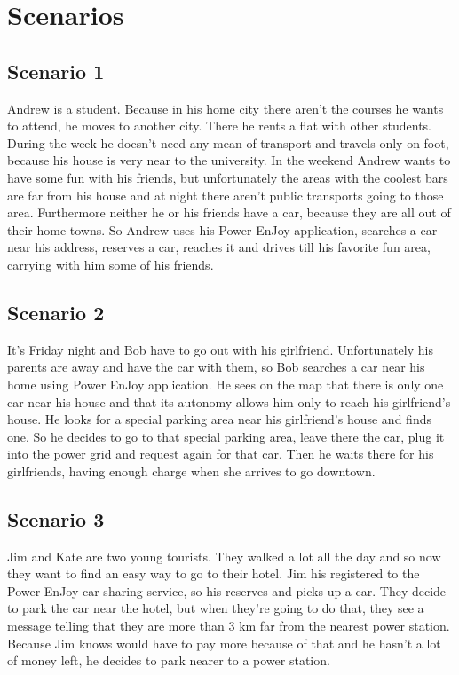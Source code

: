 \section{Scenarios}

\subsection{Scenario 1}

Andrew is a student. Because in his home city there aren't the courses he wants to attend, he moves to another city. There he rents a flat with other students. During the week he doesn't need any mean of transport and travels only on foot,  because his house is very near to the university. In the weekend Andrew wants to have some fun with his friends, but	unfortunately the areas with the coolest bars are far from his house and at night there aren't public transports going to those area. Furthermore neither he or his friends have a car, because they are all out of their home towns. So Andrew uses his Power EnJoy application, searches a car near his address, reserves a car, reaches it and drives till his favorite fun area, carrying with him some of his friends.

\subsection{Scenario 2}

It's Friday night and Bob have to go out with his girlfriend. Unfortunately his parents are away and have the car with them, so Bob searches a car near his home using Power EnJoy application. He sees on the map that there is only one car near his house and that its autonomy allows him only to reach his girlfriend's house. He looks for a special parking area near his girlfriend's house and finds one.
So he decides to go to that special parking area, leave there the car, plug it into the power grid and request again for that car. Then he waits there for his girlfriends, having enough charge when she arrives to go downtown.

\subsection{Scenario 3}

Jim and Kate are two young tourists. They walked a lot all the day and so now they want to find an easy way to go to their hotel.
Jim his registered to the Power EnJoy car-sharing service, so his reserves and picks up a car. They decide to park the car near the hotel, but when they're going to do that, they see a message telling that they are more than 3 km far from the nearest power station. Because Jim knows would have to pay more because of that and he hasn't a lot of money left, he decides to park nearer to a power station.
    
